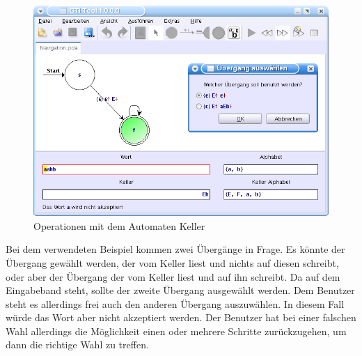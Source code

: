 \begin{figure}[h!]
\begin{center}
\includegraphics[width=12cm]{../images/grammar_pda.png}
\caption{Operationen mit dem Automaten Keller}
\end{center}
\end{figure}

Bei dem verwendeten Beispiel kommen zwei Übergänge in Frage. Es könnte der
Übergang gewählt werden, der  vom Keller liest und nichts auf diesen
schreibt, oder aber der Übergang der  vom Keller liest und
 auf ihn schreibt. Da  auf dem
Eingabeband steht, sollte der zweite Übergang ausgewählt werden. Dem Benutzer
steht es allerdings frei auch den anderen Übergang auszuwählen. In diesem Fall
würde das Wort  aber nicht akzeptiert
werden. Der Benutzer hat bei einer falschen Wahl allerdings die Möglichkeit
einen oder mehrere Schritte zurückzugehen, um dann die richtige Wahl zu treffen.
